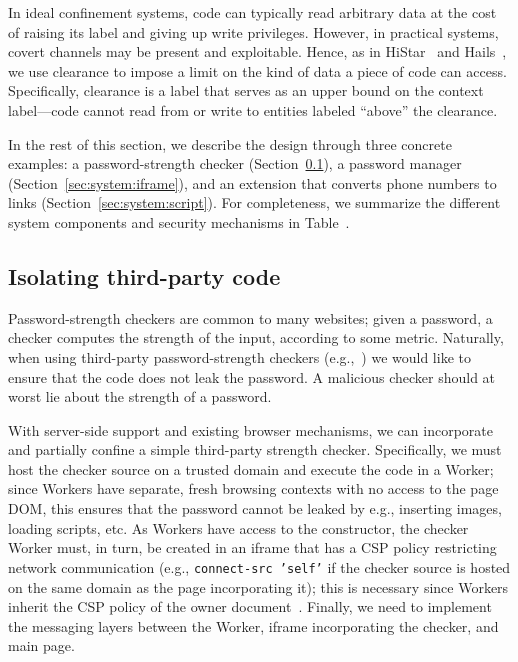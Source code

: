 In ideal confinement systems, code can typically read arbitrary data
at the cost of raising its label and giving up write privileges.
%
However, in practical systems, covert channels may be present and
exploitable.
%
Hence, as in HiStar~ and Hails~,
we use clearance to impose a limit on the kind of data a piece of code
can access.
%
Specifically, clearance is a label that serves as an upper bound on
the context label---code cannot read from or write to entities labeled
``above'' the clearance.


In the rest of this section, we describe the \sys{} design through
three concrete examples: a password-strength checker
(Section~\ref{sec:system:worker}), a password manager
(Section~\ref{sec:system:iframe}), and an extension that converts
phone numbers to links (Section~\ref{sec:system:script}).
%
For completeness, we summarize the different system components and
security mechanisms in Table~.



\subsection{Isolating third-party code}
\label{sec:system:worker}

Password-strength checkers are common to many websites;
%
given a password, a checker computes the strength of the input,
according to some metric.
%
Naturally, when using third-party password-strength checkers
(e.g.,~) we would like to ensure that the
code does not leak the password.
%
A malicious checker should at worst lie about the strength of a
password.

With server-side support and existing browser mechanisms, we can
incorporate and partially confine a simple third-party strength
checker.
%
Specifically, we must host the checker source on a trusted domain and
execute the code in a Worker; since Workers have separate, fresh
browsing contexts with no access to the page DOM, this ensures that
the password cannot be leaked by e.g., inserting images, loading
scripts, etc.
%
As Workers have access to the \xhr{} constructor, the checker Worker
must, in turn, be created in an iframe that has a CSP policy
restricting network communication (e.g., \texttt{connect-src 'self'}
if the checker source is hosted on the same domain as the page
incorporating it); this is necessary since Workers inherit the CSP
policy of the owner document~.
%
Finally, we need to implement the messaging layers between the Worker,
iframe incorporating the checker, and main page.

